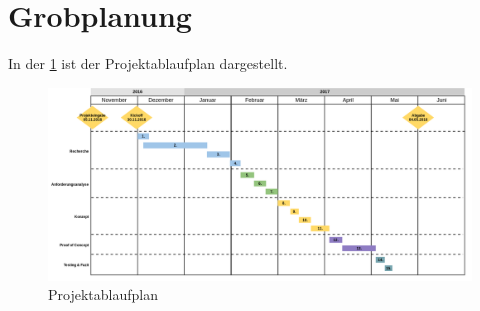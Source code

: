 \section{Grobplanung}
In der \cref{fig:einleitung:projektablaufplan}  ist der Projektablaufplan dargestellt.
\begin{figure}
	\centering
	\includegraphics[width=1\textwidth]{images/projektablaufplan}
	\caption{Projektablaufplan}
	\label{fig:einleitung:projektablaufplan}
\end{figure}
\\\\
